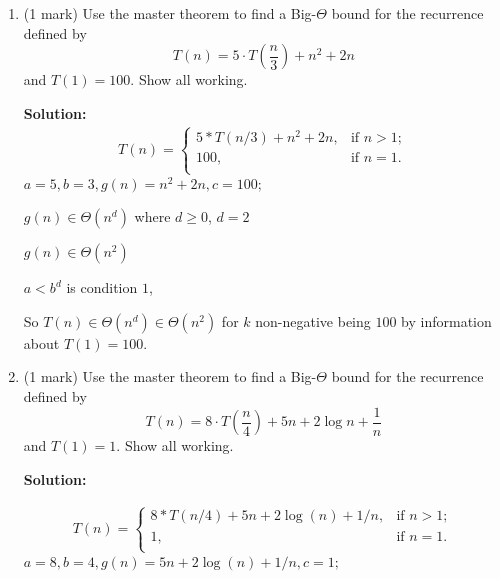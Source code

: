 \documentclass[a4,13pt]{extarticle}
\newenvironment{Solution}{\color{blue}\textbf{Solution:}}{}
\begin{document}
\begin{enumerate}
\begin{enumerate}
\begin{enumerate}
\begin{Solution}
	      	      $a=b^d$ is condition $2$,
	      	      
	      	      So $T(n) \in \Theta(n^d\log(n)) \in \Theta(\log(n))$ for $k$ non-negative being $1$ by information about $T(1) = O(1)$.
	      	        \end{Solution}
	      	
	      	      	\item (1 mark) Use the master theorem to find a Big-$\Theta$ bound for the recurrence defined by $$T(n)=5 \cdot T\left(\frac{n}{3}\right) + n^2 + 2n$$ and $T(1)=100$. Show all working.
	      	      	      	
	      	      	\begin{Solution}
	      	      	\begin{align*}
	      	      	T(n)=\begin{cases}
	      	      	5*T(n/3)+n^2+2n, & \text{if $n > 1$}; \\
	      	      	100,  & \text{if $n = 1$.}\\
	      	      	\end{cases}
	      	      \end{align*}
	      	      $a=5, b=3,g(n)=n^2+2n,c=100;$
	      	      
	      	      $g(n) \in \Theta(n^d)$ where $d\geq0$, $d = 2$
	      	      
	      	      $g(n) \in \Theta(n^2)$
	      	      
	      	      $a<b^d$ is condition $1$,
	      	      
	      	      So $T(n) \in \Theta(n^d) \in \Theta(n^2)$ for $k$ non-negative being $100$ by information about $T(1) = 100$.
	      	        \end{Solution}
	      	
	      	      	\item (1 mark) Use the master theorem to find a Big-$\Theta$ bound for the recurrence defined by $$T(n)=8 \cdot T\left(\frac{n}{4}\right) + 5n + 2\log n +\frac 1n $$ and $T(1)=1$. Show all working.
	      	      	
	      	      	\begin{Solution}
	      	      	
	      	      	\begin{align*}
	      	      	T(n)=\begin{cases}
	      	      	8*T(n/4)+5n+2\log(n)+1/n, & \text{if $n > 1$}; \\
	      	      	1,  & \text{if $n = 1$.}\\
	      	      	\end{cases}
	      	      \end{align*}
	      	      $a=8, b=4,g(n)=5n+2\log(n)+1/n,c=1;$
	      	      

\end{Solution}
\end{enumerate}
\end{enumerate}
\end{enumerate}
\end{document}
